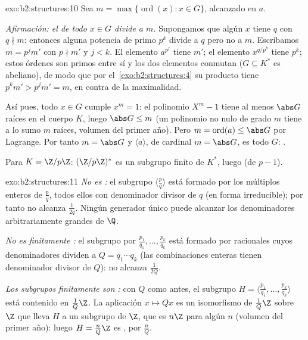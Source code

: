 \begin{solution}{exo:b2:structures:10}
Sea $m = \max\{\operatorname{ord}(x) : x \in G\}$, alcanzado en $a$.

\emph{Afirmación: el  de todo $x \in G$ divide a $m$.} Supongamos
que algún $x$ tiene  $q$ con $q \nmid m$: entonces alguna
potencia de primo $p^k$ divide a $q$ pero no a $m$. Escribamos $m =
p^j m'$ con $p \nmid m'$ y $j < k$. El elemento $a^{p^j}$ tiene 
$m'$; el elemento $x^{q/p^k}$ tiene  $p^k$; estos órdenes son
primos entre sí y los dos elementos conmutan ($G \subseteq K^*$ es
abeliano), de modo que por el~\cref{exo:b2:structures:4} su producto
tiene  $p^k m' > p^j m' = m$, en contra de la maximalidad.

Así pues, todo $x \in G$ cumple $x^m = 1$: el polinomio $X^m - 1$
tiene al menos $\abs G$ raíces en el cuerpo $K$, luego $\abs G \leq
m$ (un polinomio no nulo de grado $m$ tiene a lo sumo $m$ raíces,
volumen del primer año). Pero $m = \operatorname{ord}(a) \leq \abs G$
por Lagrange. Por tanto $m = \abs G$ y $\langle a \rangle$, de
cardinal $m = \abs G$, es todo $G$: .

Para $K = \Z/p\Z$: $(\Z/p\Z)^*$ es un subgrupo finito de $K^*$, luego
 (de  $p - 1$).
\end{solution}

\begin{solution}{exo:b2:structures:11}
\emph{No es :} el subgrupo $\langle \frac pq\rangle$ está
formado por los múltiplos enteros de $\frac pq$, todos ellos con
denominador divisor de $q$ (en forma irreducible); por tanto no
alcanza $\frac{1}{2q}$. Ningún generador único puede alcanzar los
denominadores arbitrariamente grandes de $\Q$.

\emph{No es finitamente :} el subgrupo  por
$\frac{p_1}{q_1}, \dots, \frac{p_k}{q_k}$ está formado por racionales
cuyos denominadores dividen a $Q = q_1 \cdots q_k$ (las combinaciones
enteras tienen denominador divisor de $Q$): no alcanza
$\frac{1}{2Q}$.

\emph{Los subgrupos finitamente  son :} con $Q$ como
antes, el subgrupo $H = \langle \frac{p_1}{q_1}, \dots,
\frac{p_k}{q_k}\rangle$ está contenido en $\frac{1}{Q}\Z$. La
aplicación $x \mapsto Qx$ es un isomorfismo de $\frac1Q\Z$ sobre $\Z$
que lleva $H$ a un subgrupo de $\Z$, que es $n\Z$ para algún $n$
(volumen del primer año): luego $H = \frac{n}{Q}\Z$ es ,
 por $\frac nQ$.
\end{solution}

